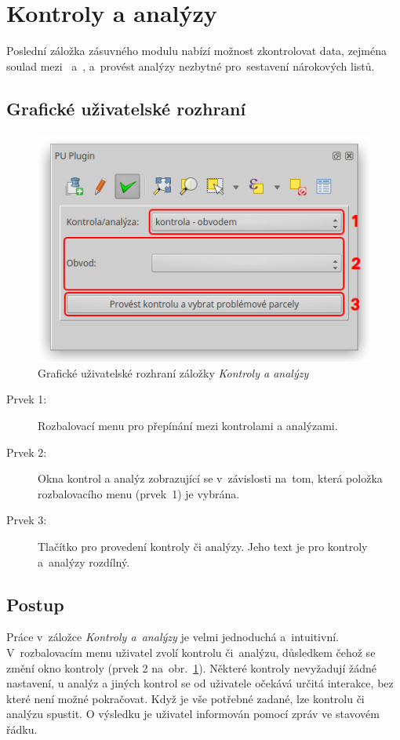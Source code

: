 \newpage

\section{Kontroly a analýzy}
\label{kontroly_analyzy}

Poslední záložka zásuvného modulu nabízí možnost zkontrolovat data, zejména soulad mezi~ a~, a~provést analýzy nezbytné pro~sestavení nárokových listů.

\subsection{Grafické uživatelské rozhraní}
\label{ca_gui}

	\begin{figure}[H]
		\centering
		\includegraphics[width=.55\textwidth]{./pictures/ca_gui.png}
		\caption[Grafické uživatelské rozhraní záložky \textit{Kontroly a analýzy}]{Grafické uživatelské rozhraní záložky \textit{Kontroly a analýzy}}
		\label{fig:ca_gui}
 	\end{figure}

\begin{description}
	\item[Prvek 1:] Rozbalovací menu pro přepínání mezi kontrolami a analýzami.
	\item[Prvek 2:] Okna kontrol a analýz zobrazující se v~závislosti na~tom, která položka rozbalovacího menu (prvek~1) je vybrána.
	\item[Prvek 3:] Tlačítko pro provedení kontroly či analýzy. Jeho text je pro kontroly a~analýzy rozdílný.
\end{description}

\subsection{Postup}
\label{postup_ca}

Práce v~záložce \textit{Kontroly a~analýzy} je velmi jednoduchá a~intuitivní. V~rozbalovacím menu uživatel zvolí kontrolu či~analýzu, důsledkem čehož se změní okno kontroly (prvek 2 na~obr.~\ref{fig:ca_gui}). Některé kontroly nevyžadují žádné nastavení, u analýz a jiných kontrol se od uživatele očekává určitá interakce, bez které není možné pokračovat. Když je vše potřebné zadané, lze kontrolu či analýzu spustit. O výsledku je uživatel informován pomocí zpráv ve stavovém řádku.

